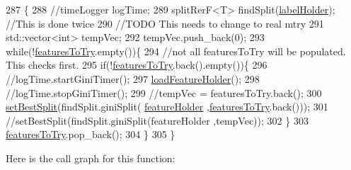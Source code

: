 \begin{DoxyCode}
287                                            \{
288                     \textcolor{comment}{//timeLogger logTime;}
289                     splitRerF<T> findSplit(\hyperlink{classfp_1_1unprocessedRerFNode_a9e1a9728861a19034c9b17d5eaa2891d}{labelHolder}); \textcolor{comment}{//This is done twice}
290                     \textcolor{comment}{//TODO This needs to change to real mtry}
291                     std::vector<int> tempVec;
292                     tempVec.push\_back(0);
293                     \textcolor{keywordflow}{while}(!\hyperlink{classfp_1_1unprocessedRerFNode_aa2028578f341c8f41cf000eb40d228f2}{featuresToTry}.empty())\{
294                         \textcolor{comment}{//not all featuresToTry will be populated.  This checks first.}
295                         \textcolor{keywordflow}{if}(!\hyperlink{classfp_1_1unprocessedRerFNode_aa2028578f341c8f41cf000eb40d228f2}{featuresToTry}.back().empty())\{
296                             \textcolor{comment}{//logTime.startGiniTimer();}
297                             \hyperlink{classfp_1_1unprocessedRerFNode_a6510faa628fda49d672dcd1b88a3834b}{loadFeatureHolder}();
298                             \textcolor{comment}{//logTime.stopGiniTimer();}
299                             \textcolor{comment}{//tempVec = featuresToTry.back();}
300                             \hyperlink{classfp_1_1unprocessedRerFNode_ac31049fede0262a8879905802884fe6f}{setBestSplit}(findSplit.giniSplit(
      \hyperlink{classfp_1_1unprocessedRerFNode_a09fa17210a5916239cba6716c636cc4e}{featureHolder} ,\hyperlink{classfp_1_1unprocessedRerFNode_aa2028578f341c8f41cf000eb40d228f2}{featuresToTry}.back()));
301                             \textcolor{comment}{//setBestSplit(findSplit.giniSplit(featureHolder ,tempVec));}
302                         \}
303                         \hyperlink{classfp_1_1unprocessedRerFNode_aa2028578f341c8f41cf000eb40d228f2}{featuresToTry}.pop\_back();
304                     \}
305                 \}
\end{DoxyCode}
Here is the call graph for this function\+:
\nopagebreak
